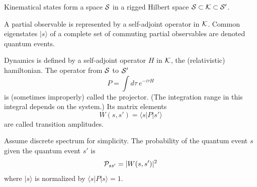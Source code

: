\documentclass[10pt,nofootinbib]{revtex4}
\begin{document}
\begin{description} 
\addtolength{\itemsep}{-.1cm}

\item[\rm\em Kinematical states.] 
Kinematical states form a space $\cal S$ in a rigged Hilbert space
${\cal S}\subset{\cal K}\subset{\cal S}'$.

\item[\rm\em Partial observables.]  A partial observable is
represented by a self-adjoint operator in $\cal K$.  Common
eigenstates $|s\rangle$ of a complete set of commuting partial
observables are denoted quantum events.

\item[\rm\em Dynamics.]  Dynamics is defined by a self-adjoint
operator $H$ in $\cal K$, the (relativistic) hamiltonian. 
 The operator from $\cal S$ to ${\cal
S}'$
\begin{equation} 
P = \int d\tau \ e^{-i\tau H} 
\label{Puno}
\end{equation} 
is (sometimes improperly) called the projector.  
(The integration range in this integral depends on the system.)  Its
matrix elements
\begin{equation} 
W(s,s') = \langle s |P|s'\rangle 
\label{Pss}
\end{equation} 
are called transition amplitudes.

\item[\rm\em Probability.]  Assume discrete spectrum for simplicity. The probability of the
quantum event $s$ given the quantum event $s'$ is 
\begin{equation}
{\cal P}_{ss'} = |W(s,s')|^2 
\end{equation} where $|s\rangle$ is
normalized by $\langle s |P|s\rangle=1$. 
 \end{description} 
\end{document}
